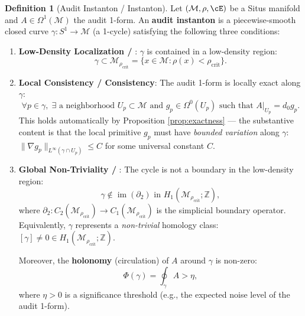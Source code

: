 \documentclass[11pt,a4paper]{article}
\theoremstyle{plain}
\theoremstyle{definition}
\newtheorem{definition}[theorem]{Definition}
\DeclareMathOperator{\im}{im}
\newcommand{\Z}{\mathbb{Z}}
\newcommand{\cM}{\mathcal{M}}
\begin{document}
\begin{definition}[Audit Instanton / Instanton]
\label{def:instanton}
Let $(\cM, \rho, \cE)$ be a Situs manifold and $A \in \Omega^1(\cM)$ the 
audit 1-form. An \textbf{audit instanton} is a piecewise-smooth closed curve 
$\gamma: S^1 \to \cM$ (a 1-cycle) satisfying the following three conditions:

\begin{enumerate}[label=\textbf{(AI\arabic*)}]
  \item \textbf{Low-Density Localization / }: 
        $\gamma$ is contained in a low-density region:
        \begin{equation}
          \gamma \subset \cM_{\rho_{\text{crit}}} = \{x \in \cM : \rho(x) < \rho_{\text{crit}}\}.
          \label{eq:AI1}
        \end{equation}
  
  \item \textbf{Local Consistency / Consistency}: 
        The audit 1-form is locally exact along $\gamma$:
        \begin{equation}
          \forall p \in \gamma, \; \exists \text{ a neighborhood } U_p \subset \cM 
          \text{ and } g_p \in \Omega^0(U_p) \text{ such that } A|_{U_p} = d_0 g_p.
          \label{eq:AI2}
        \end{equation}
        This holds automatically by Proposition \ref{prop:exactness} — the 
        substantive content is that the local primitive $g_p$ must have 
        \emph{bounded variation} along $\gamma$: 
        $\|\nabla g_p\|_{L^{\infty}(\gamma \cap U_p)} \leq C$ for some 
        universal constant $C$.
  
  \item \textbf{Global Non-Triviality / }: 
        The cycle is not a boundary in the low-density region:
        \begin{equation}
          \gamma \notin \im(\partial_2) \text{ in } H_1(\cM_{\rho_{\text{crit}}}; \Z),
          \label{eq:AI3}
        \end{equation}
        where $\partial_2: C_2(\cM_{\rho_{\text{crit}}}) \to C_1(\cM_{\rho_{\text{crit}}})$ 
        is the simplicial boundary operator. Equivalently, $\gamma$ represents 
        a \emph{non-trivial} homology class:
        $[\gamma] \neq 0 \in H_1(\cM_{\rho_{\text{crit}}}; \Z)$.

        Moreover, the \textbf{holonomy} (circulation) of $A$ around $\gamma$ 
        is non-zero:
        \begin{equation}
          \Phi(\gamma) = \oint_{\gamma} A > \eta,
          \label{eq:holonomy}
        \end{equation}
        where $\eta > 0$ is a significance threshold (e.g., the expected 
        noise level of the audit 1-form).
  \end{enumerate}
\end{definition}
\end{document}
